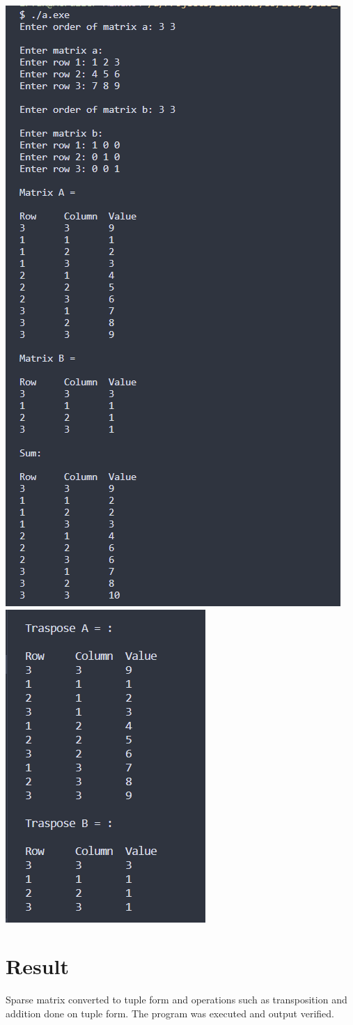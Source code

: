 \includegraphics[]{Cycle_1/Outputs/SparseMatrix.png}
\includegraphics[]{Cycle_1/Outputs/SparseTranspose.png}

\section{Result}
Sparse matrix converted to tuple form and operations such as transposition and addition done
on tuple form. The program was executed and output verified.